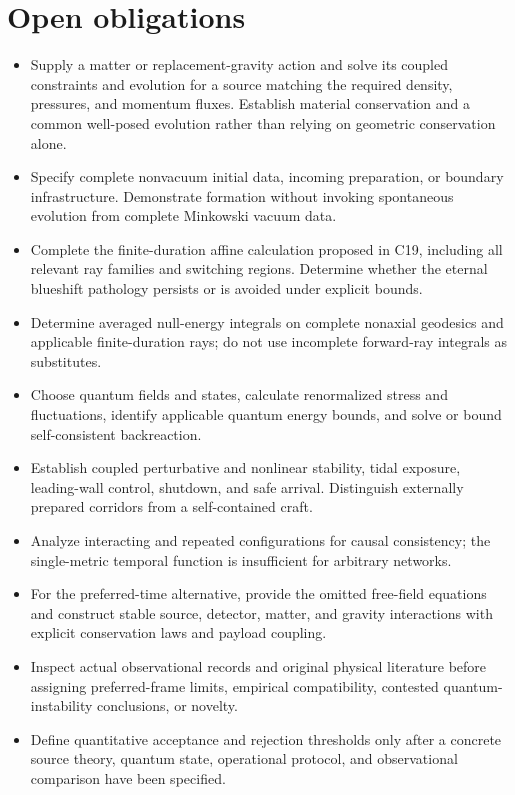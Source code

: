 \documentclass[11pt]{article}
\begin{document}
\section{Open obligations}
\begin{itemize}
\item Supply a matter or replacement-gravity action and solve its coupled constraints and evolution for a source matching the required density, pressures, and momentum fluxes. Establish material conservation and a common well-posed evolution rather than relying on geometric conservation alone.
\item Specify complete nonvacuum initial data, incoming preparation, or boundary infrastructure. Demonstrate formation without invoking spontaneous evolution from complete Minkowski vacuum data.
\item Complete the finite-duration affine calculation proposed in C19, including all relevant ray families and switching regions. Determine whether the eternal blueshift pathology persists or is avoided under explicit bounds.
\item Determine averaged null-energy integrals on complete nonaxial geodesics and applicable finite-duration rays; do not use incomplete forward-ray integrals as substitutes.
\item Choose quantum fields and states, calculate renormalized stress and fluctuations, identify applicable quantum energy bounds, and solve or bound self-consistent backreaction.
\item Establish coupled perturbative and nonlinear stability, tidal exposure, leading-wall control, shutdown, and safe arrival. Distinguish externally prepared corridors from a self-contained craft.
\item Analyze interacting and repeated configurations for causal consistency; the single-metric temporal function is insufficient for arbitrary networks.
\item For the preferred-time alternative, provide the omitted free-field equations and construct stable source, detector, matter, and gravity interactions with explicit conservation laws and payload coupling.
\item Inspect actual observational records and original physical literature before assigning preferred-frame limits, empirical compatibility, contested quantum-instability conclusions, or novelty.
\item Define quantitative acceptance and rejection thresholds only after a concrete source theory, quantum state, operational protocol, and observational comparison have been specified.
\end{itemize}
\end{document}
